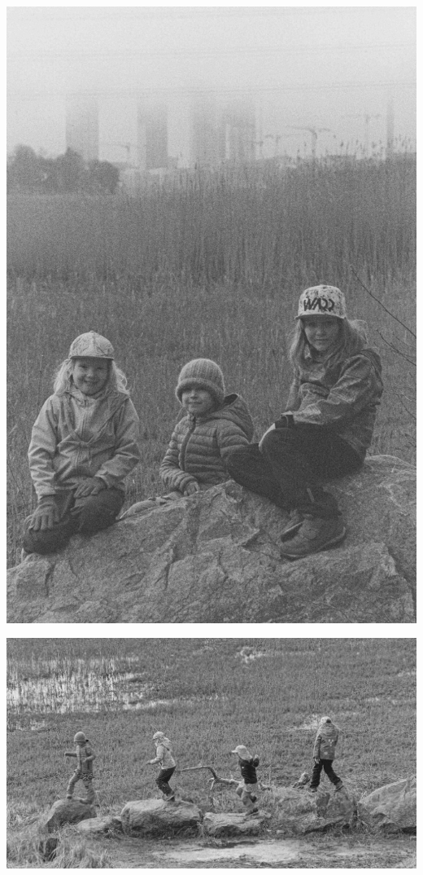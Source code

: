 \documentclass[10pt,finnish,a5paper,headings=small,twoside=semi]{scrartcl}
\begin{document}
\begin{multicols}{2}
	\vspace*{0.16cm}
	\begin{center}
		\noindent\includegraphics[width=0.8\linewidth]{assets/kolkkienpäiväretkibw13}
	\end{center}


\end{multicols}

\vspace*{-0.32cm}
\begin{center}
	\noindent\includegraphics[width=0.8\linewidth]{assets/kolkkienpäiväretkibw3}
\end{center}
\end{document}
